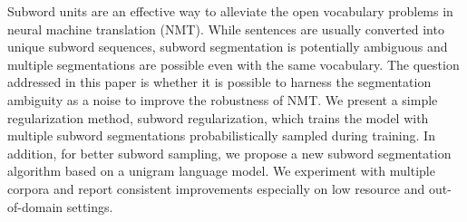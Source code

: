 Subword units are an effective way to alleviate the open vocabulary problems in neural machine translation (NMT). While sentences are usually converted into unique subword sequences, subword segmentation is potentially ambiguous and multiple segmentations are possible even with the same vocabulary. The question addressed in this paper is whether it is possible to harness the segmentation ambiguity as a noise to improve the robustness of NMT. We present a simple regularization method, subword regularization, which trains the model with multiple subword segmentations probabilistically sampled during training.  In addition, for better subword sampling, we propose a new subword segmentation algorithm based on a unigram language model.  We experiment with multiple corpora and report consistent improvements especially on low resource and out-of-domain settings.
